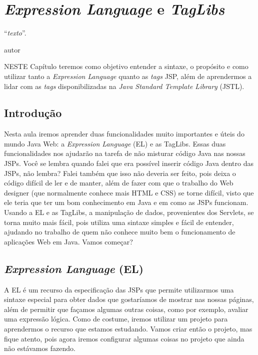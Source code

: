 \chapter{\textit{Expression Language} e \textit{TagLibs}}
\epigraph{``\textit{texto}''.}{autor}

\lettrine[lines=4, lhang=0.1, lraise=0, loversize=0.2, findent=0.1em]{\textcolor{corAzulTema}{N}}{ESTE} Capítulo teremos como objetivo entender a sintaxe, o propósito e como utilizar tanto a \textit{Expression Language} quanto as \textit{tags} JSP, além de aprendermos a lidar com as \textit{tags} disponibilizadas na \textit{Java Standard Template Library} (JSTL).


\section{Introdução}

Nesta aula iremos aprender duas funcionalidades muito importantes e úteis do mundo Java Web: a \textit{Expression Language} (EL) e as TagLibs. Essas duas funcionalidades nos ajudarão na tarefa de não misturar código Java nas nossas JSPs. Você se lembra quando falei que era possível inserir código Java dentro das JSPs, não lembra? Falei também que isso não deveria ser feito, pois deixa o código difícil de ler e de manter, além de fazer com que o trabalho do Web designer (que normalmente conhece mais HTML e CSS) se torne difícil, visto que ele teria que ter um bom conhecimento em Java e em como as JSPs funcionam. Usando a EL e as TagLibs, a manipulação de dados, provenientes dos Servlets, se torna muito mais fácil, pois utiliza uma sintaxe simples e fácil de entender, ajudando no trabalho de quem não conhece muito bem o funcionamento de aplicações Web em Java. Vamos começar?


\section{\textit{Expression Language} (EL)}

A EL é um recurso da especificação das JSPs que permite utilizarmos uma sintaxe especial para obter dados que gostaríamos de mostrar nas nossas páginas, além de permitir que façamos algumas outras coisas, como por exemplo, avaliar uma expressão lógica. Como de costume, iremos utilizar um projeto para aprendermos o recurso que estamos estudando. Vamos criar então o projeto, mas fique atento, pois agora iremos configurar algumas coisas no projeto que ainda não estávamos fazendo.

